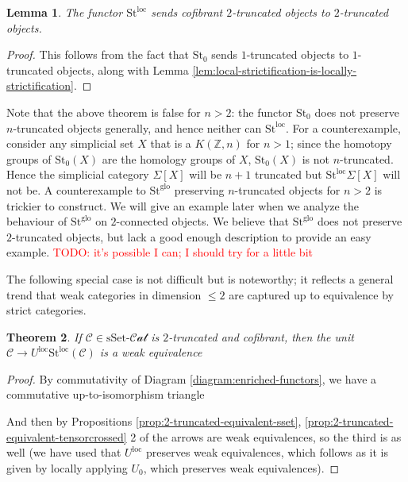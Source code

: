 \documentclass[12pt]{article}
\newtheorem{theorem}{Theorem}[section]
\newtheorem{lemma}[theorem]{Lemma}
\theoremstyle{definition}
\newcommand{\TODO}[1]{\textcolor{red}{TODO: {#1}}}
\newcommand{\C}{\mathcal{C}}
\newcommand{\ssetcat}{\text{sSet}\text{-}\mathcal{Cat}}
\newcommand{\ho}{\text{ho}}
\newcommand{\sus}{\Sigma}
\newcommand{\st}{\text{St}}
\newcommand{\leftone}{\st^{\text{loc}}}
\newcommand{\rightone}{U^{\text{loc}}}
\newcommand{\lefttwo}{\st^{\text{glo}}}
\newcommand{\hotwo}{\ho_{(2,1)}}
\begin{document}
	\begin{lemma}\label{lem:2-truncated-preserved}
		The functor $\leftone$ sends cofibrant $2$-truncated objects to $2$-truncated objects.
	\end{lemma}
	\begin{proof}
		This follows from the fact that $\st_0$ sends $1$-truncated objects to $1$-truncated objects, along with Lemma \ref{lem:local-strictification-is-locally-strictification}.
	\end{proof}
	Note that the above theorem is false for $n > 2$: the functor $\st_0$ does not preserve $n$-truncated objects generally, and hence neither can $\leftone$. 
	For a counterexample, consider any simplicial set $X$ that is a $K(\mathbb{Z},n)$ for $n > 1$; since the homotopy groups of $\st_0(X)$ are the homology groups of $X$, $\st_0(X)$ is not $n$-truncated. 
	Hence the simplicial category $\sus[X]$ will be $n+1$ truncated but $\leftone \sus[X]$ will not be. 
	A counterexample to $\lefttwo$ preserving $n$-truncated objects for $n > 2$ is trickier to construct. 
	We will give an example later when we analyze the behaviour of $\lefttwo$ on $2$-connected objects. We believe that $\lefttwo$ does not preserve $2$-truncated objects, but lack a good enough description to provide an easy example. \TODO{it's possible I can; I should try for a little bit} 
	\par 
	The following special case is not difficult but is noteworthy; it reflects a general trend that weak categories in dimension $\le 2$ are captured up to equivalence by strict categories. 
	\begin{theorem}
		If $\C \in \ssetcat$ is $2$-truncated and cofibrant, then the unit $\C \to \rightone \leftone (\C)$ is a weak equivalence 
	\end{theorem}
	\begin{proof}
		By commutativity of Diagram \ref{diagram:enriched-functors}, we have a commutative up-to-isomorphism triangle
		\begin{center}
		\end{center}
		And then by Propositions \ref{prop:2-truncated-equivalent-sset}, \ref{prop:2-truncated-equivalent-tensorcrossed} 2 of the arrows are weak equivalences, so the third is as well (we have used that $\rightone$ preserves weak equivalences, which follows as it is given by locally applying $U_0$, which preserves weak equivalences). 
	\end{proof}
\end{document}
